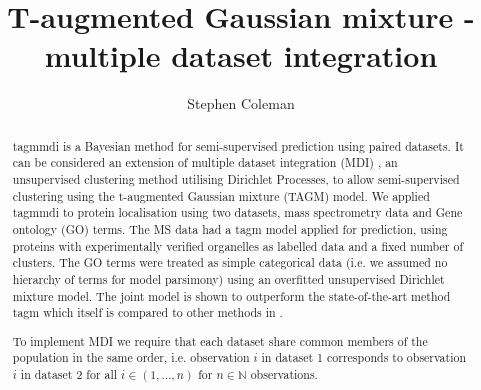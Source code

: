 \documentclass[11pt]{article} %
\title{T-augmented Gaussian mixture - multiple dataset integration}
\author{Stephen Coleman}
\providecommand{\keywords}[1]
{
  \small	
  \textbf{\textit{Keywords---}} #1
}
\begin{document}
 \pgfplotsset{compat=1.16}
\maketitle

\begin{abstract}
tagmmdi is a Bayesian method for semi-supervised prediction using paired datasets. It can be considered an extension of multiple dataset integration (MDI) \cite{kirkBayesianCorrelatedClustering2012}, an unsupervised clustering method utilising Dirichlet Processes, to allow semi-supervised clustering using the t-augmented Gaussian mixture (TAGM) model. We applied tagmmdi to protein localisation using two datasets, mass spectrometry data and Gene ontology (GO) terms. The MS data had a tagm model applied for prediction, using proteins with experimentally verified organelles as labelled data and a fixed number of clusters. The GO terms were treated as simple categorical data (i.e. we assumed no hierarchy of terms for model parsimony) using an overfitted unsupervised Dirichlet mixture model. The joint model is shown to outperform the state-of-the-art method tagm which itself is compared to other methods in \citet{CrookBayesianMixtureModelling2018a}.

To implement MDI we require that each dataset share common members of the population in the same order, i.e. observation $i$ in dataset 1 corresponds to observation $i$ in dataset 2 for all $i \in (1, \ldots, n)$ for $n \in \mathbb{N}$ observations.

\end{abstract}

\maketitle

\end{document}
